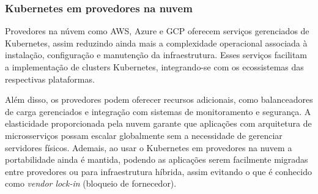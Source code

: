 






\subsubsection{Kubernetes em provedores na nuvem}
Provedores na núvem como AWS, Azure e GCP oferecem serviços gerenciados de Kubernetes, assim reduzindo ainda mais a complexidade operacional associada à instalação, configuração e manutenção da infraestrutura. Esses serviços facilitam a implementação de clusters Kubernetes, integrando-se com os ecossistemas das respectivas plataformas.

Além disso, os provedores podem oferecer recursos adicionais, como balanceadores de carga gerenciados e integração com sistemas de monitoramento e segurança. A elasticidade proporcionada pela nuvem garante que aplicações com arquitetura de microsserviços possam escalar globalmente sem a necessidade de gerenciar servidores físicos. Ademais, ao usar o Kubernetes em provedores na nuvem a portabilidade ainda é mantida, podendo as aplicações serem facilmente migradas entre provedores ou para infraestrutura híbrida, assim evitando o que é conhecido como \emph{vendor lock-in} (bloqueio de fornecedor).



